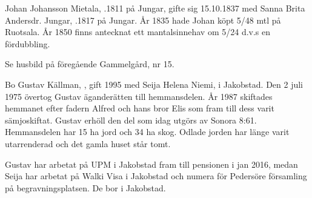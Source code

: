 Johan Johansson Mietala, .1811 på Jungar, gifte sig 15.10.1837 med Sanna Brita Andersdr. Jungar, .1817 på Jungar. År 1835 hade Johan köpt 5/48 mtl på Ruotsala. År 1850 finns antecknat ett mantalsinnehav om 5/24 d.v.s en fördubbling.
\begin{jhchildren}
  \item {}
  \item {}
  \item {}
  \item {}
  \item {}
  \item {}
  \item {}
  \item {}
\end{jhchildren}




Se husbild på föregående Gammelgård, nr 15.

Bo Gustav Källman, , gift 1995 med Seija Helena Niemi,  i Jakobstad. Den 2 juli 1975 övertog Gustav äganderätten till hemmansdelen. År 1987 skiftades hemmanet efter fadern Alfred och hans bror Elis som fram till dess varit sämjoskiftat. Gustav erhöll den del som idag utgörs av Sonora 8:61. Hemmansdelen har 15 ha jord och 34 ha skog. Odlade jorden har länge varit utarrenderad och det gamla huset står tomt.

Gustav har arbetat på UPM i Jakobstad fram till pensionen i jan 2016, medan Seija har arbetat på Walki Visa i Jakobstad och numera för Pedersöre församling på begravningsplatsen. De bor i Jakobstad.
\begin{jhchildren}
  \item {}
  \item {}
\end{jhchildren}


